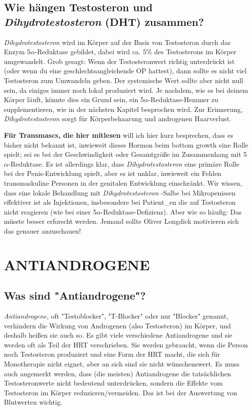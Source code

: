 \documentclass{article}
\begin{document}
\subsection{Wie hängen Testosteron und \textit{Dihydrotestosteron} (DHT) zusammen?}

\textit{Dihydrotestosteron} wird im Körper auf der Basis von Testosteron durch das Enzym 5$\alpha$-Reduktase gebildet, dabei wird ca. 5\% des Testosterons im Körper umgewandelt. Grob gesagt: Wenn der Testosteronwert richtig unterdrückt ist (oder wenn du eine geschlechtsangleichende OP hattest), dann sollte es nicht viel Testosteron zum Umwandeln geben. Der systemische Wert sollte aber nicht null sein, da einiges immer noch lokal produziert wird. Je nachdem, wie es bei deinem Körper läuft, könnte dies ein Grund sein, ein 5$\alpha$-Reduktase-Hemmer zu supplementieren, wie in der nächsten Kapitel besprochen wird. Zur Erinnerung, \textit{Dihydrotestosteron }sorgt für Körperbehaarung und androgenen Haarverlust.

\textbf{Für Transmascs, die hier mitlesen} will ich hier kurz besprechen, dass es bisher nicht bekannt ist, inwieweit dieses Hormon beim bottom growth eine Rolle spielt; sei es bei der Geschwindigkeit oder Gesamtgröße im Zusammenhang mit 5$\alpha$-Reduktase. Es ist allerdings klar, dass \textit{Dihydrotestosteron }eine primäre Rolle bei der Penis-Entwicklung spielt, aber es ist unklar, inwieweit ein Fehlen transmaskuline Personen in der genitalen Entwicklung einschränkt. Wir wissen, dass eine lokale Behandlung mit \textit{Dihydrotestosteron }-Salbe bei Mikropenissen effektiver ist als Injektionen, insbesondere bei Patient\_en die auf Testosteron nicht reagieren (wie bei einer 5$\alpha$-Reduktase-Defizienz). Aber wie so häufig: Das müsste besser erforscht werden. Jemand sollte Oliver Longdick motivieren sich das genauer anzuschauen!



\section{ANTIANDROGENE}\label{AA}

\subsection{Was sind "Antiandrogene"?}

\textit{Antiandrogene, }oft "Testoblocker", "T-Blocker"  oder nur "Blocker" genannt, verhindern die Wirkung von Androgenen (also Testosteron) im Körper, und deshalb heißen sie auch so. Es gibt viele verschiedene Antiandrogene und sie werden oft als Teil der HRT verschrieben. Sie werden gebraucht, wenn die Person noch Testosteron produziert und eine Form der HRT macht, die sich für Monotherapie nicht eignet, aber an sich sind sie nicht wünschenswert. Es muss auch angemerkt werden, dass (die meisten) Antiandrogene die tatsächlichen Testosteronwerte nicht bedeutend unterdrücken, sondern die Effekte vom Testosteron im Körper reduzieren/vermeiden. Das ist bei der Auswertung von Blutwerten wichtig.
\end{document}
